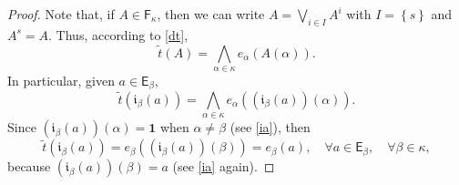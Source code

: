 \documentclass[10pt,a4paper]{amsart}
\begin{document}
\begin{proof}
Note that, if $A\in\mathsf{F}_{\kappa}$, then we can write $A=\bigvee_{i\in I}A^{i}$
with $I=\left\{ s\right\} $ and $A^{s}=A$. Thus, according to \eqref{dt},
\begin{equation}
\tilde{t}\left(A\right)={\textstyle \bigwedge_{\alpha\in\kappa}}e_{\alpha}\left(A\left(\alpha\right)\right).\label{dt1}
\end{equation}
In particular, given $a\in\mathsf{E}_{\beta}$,
\[
\tilde{t}\left(\mathfrak{i}_{\beta}\left(a\right)\right)={\textstyle \bigwedge_{\alpha\in\kappa}}e_{\alpha}\left(\left(\mathfrak{i}_{\beta}\left(a\right)\right)\left(\alpha\right)\right).
\]
Since $\left(\mathfrak{i}_{\beta}\left(a\right)\right)\left(\alpha\right)=\mathbf{1}$
when $\alpha\neq\beta$ (see \eqref{ia}), then 
\begin{equation}
\tilde{t}\left(\mathfrak{i}_{\beta}\left(a\right)\right)=e_{\beta}\left(\left(\mathfrak{i}_{\beta}\left(a\right)\right)\left(\beta\right)\right)=e_{\beta}\left(a\right),\quad\forall a\in\mathsf{E}_{\beta},\quad\forall\beta\in\kappa,\label{tia2}
\end{equation}
because $\left(\mathfrak{i}_{\beta}\left(a\right)\right)\left(\beta\right)=a$
(see \eqref{ia} again).


\end{proof}
\end{document}
